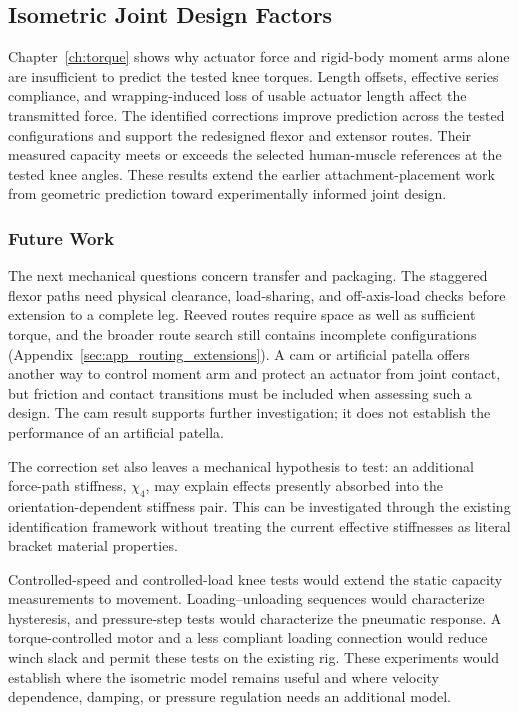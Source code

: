 \subsection{Isometric Joint Design Factors}

Chapter~\ref{ch:torque} shows why actuator force and rigid-body moment arms alone are insufficient to predict the tested knee torques. Length offsets, effective series compliance, and wrapping-induced loss of usable actuator length affect the transmitted force. The identified corrections improve prediction across the tested configurations and support the redesigned flexor and extensor routes. Their measured capacity meets or exceeds the selected human-muscle references at the tested knee angles. These results extend the earlier attachment-placement work \citep{bolen_bipedal_2019,bolen_determination_2019,morrow_optimization_2020} from geometric prediction toward experimentally informed joint design.

\subsubsection{Future Work}\label{sec:fw_routing}

The next mechanical questions concern transfer and packaging. The staggered flexor paths need physical clearance, load-sharing, and off-axis-load checks before extension to a complete leg. Reeved routes require space as well as sufficient torque, and the broader route search still contains incomplete configurations (Appendix~\ref{sec:app_routing_extensions}). A cam or artificial patella offers another way to control moment arm and protect an actuator from joint contact, but friction and contact transitions must be included when assessing such a design. The cam result supports further investigation; it does not establish the performance of an artificial patella.

The correction set also leaves a mechanical hypothesis to test: an additional force-path stiffness, $\chi_{4}$, may explain effects presently absorbed into the orientation-dependent stiffness pair. This can be investigated through the existing identification framework without treating the current effective stiffnesses as literal bracket material properties.

Controlled-speed and controlled-load knee tests would extend the static capacity measurements to movement. Loading--unloading sequences would characterize hysteresis, and pressure-step tests would characterize the pneumatic response. A torque-controlled motor and a less compliant loading connection would reduce winch slack and permit these tests on the existing rig. These experiments would establish where the isometric model remains useful and where velocity dependence, damping, or pressure regulation needs an additional model.

